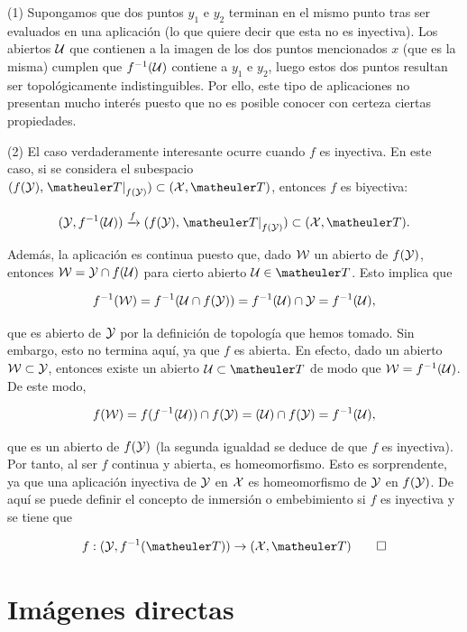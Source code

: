 \begin{obs}[Inyectividad]
	
	(1) Supongamos que dos puntos $y_1$ e $y_2$ terminan en el mismo punto tras ser evaluados en una aplicación (lo que quiere decir que esta no es inyectiva). Los abiertos $\mathcal{U}$ que contienen a la imagen de los dos puntos mencionados $x$ (que es la misma) cumplen que $f^{-1}(\mathcal{U})$ contiene a $y_1$ e $y_2$, luego estos dos puntos resultan ser topológicamente indistinguibles. Por ello, este tipo de aplicaciones no presentan mucho interés puesto que no es posible conocer con certeza ciertas propiedades.
	
	(2) El caso verdaderamente interesante ocurre cuando $f$ es inyectiva. En este caso, si se considera el subespacio $(f(\mathcal{\Y}),\left.\T\right|_{f(\mathcal{\Y})}) \subset (\mathcal{\X},\T)$, entonces $f$ es biyectiva:
	
	\[(\mathcal{\Y},f^{-1}(\U)) \xrightarrow{f} (f(\mathcal{\Y}),\left.\T\right|_{f(\mathcal{\Y})}) \subset (\mathcal{\X},\T).\]
	
	Además, la aplicación es continua puesto que, dado $\mathcal{W}$ un abierto de $f(\mathcal{\mathcal{Y}})$, entonces $\mathcal{W}=\mathcal{\mathcal{Y}}\cap f(\mathcal{U})$ para cierto abierto $\U\in \T$. Esto implica que
	
	\[f^{-1}(\mathcal{W})=f^{-1}(\mathcal{U}\cap f(\mathcal{\mathcal{Y}}))=f^{-1}(\mathcal{U})\cap \mathcal{\mathcal{Y}}=f^{-1}(\mathcal{U}),\]
	
	que es abierto de $\mathcal{\mathcal{Y}}$ por la definición de topología que hemos tomado. Sin embargo, esto no termina aquí, ya que $f$ es abierta. En efecto, dado un abierto $\mathcal{W}\subset \mathcal{\mathcal{Y}}$, entonces existe un abierto $\U\subset \T$ de modo que $\mathcal{W}=f^{-1}(\mathcal{U})$. De este modo, 
	
	\[f(\mathcal{W})=f(f^{-1}(\mathcal{U}))\cap f(\mathcal{\mathcal{Y}})=(\mathcal{U})\cap f(\mathcal{\mathcal{Y}})=f^{-1}(\mathcal{U}),\]
	
	que es un abierto de $f(\mathcal{\mathcal{Y}})$ (la segunda igualdad se deduce de que $f$ es inyectiva). Por tanto, al ser $f$ continua y abierta, es homeomorfismo. Esto es sorprendente, ya que una aplicación inyectiva de $\mathcal{\mathcal{Y}}$ en $\mathcal{\mathcal{X}}$ es homeomorfismo de $\mathcal{\mathcal{Y}}$ en $f(\mathcal{\mathcal{Y}})$. De aquí se puede definir el concepto de inmersión o embebimiento si $f$ es inyectiva y se tiene que 
	
	\[f:(\mathcal{\Y},f^{-1}(\T)) \to (\mathcal{\X},\T)\qedhere\]
	
\end{obs}

\section{Imágenes directas}


